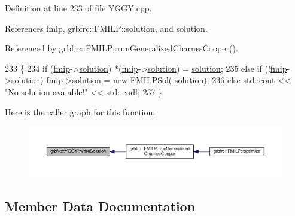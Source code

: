 Definition at line 233 of file Y\+G\+G\+Y.\+cpp.



References fmip, grbfrc\+::\+F\+M\+I\+L\+P\+::solution, and solution.



Referenced by grbfrc\+::\+F\+M\+I\+L\+P\+::run\+Generalized\+Charnes\+Cooper().


\begin{DoxyCode}
233                          \{
234     \textcolor{keywordflow}{if} (\hyperlink{classgrbfrc_1_1YGGY_aa4f63c22c95cd48cd87756ebc5de53aa}{fmip}->\hyperlink{classgrbfrc_1_1FMILP_ae7b20c4efb2d3a689d46a5b88329b207}{solution}) *(\hyperlink{classgrbfrc_1_1YGGY_aa4f63c22c95cd48cd87756ebc5de53aa}{fmip}->\hyperlink{classgrbfrc_1_1FMILP_ae7b20c4efb2d3a689d46a5b88329b207}{solution}) = \hyperlink{classgrbfrc_1_1YGGY_a26d38a8358290866b02c11a09ddd5b4e}{solution};
235     \textcolor{keywordflow}{else} \textcolor{keywordflow}{if} (!\hyperlink{classgrbfrc_1_1YGGY_aa4f63c22c95cd48cd87756ebc5de53aa}{fmip}->\hyperlink{classgrbfrc_1_1FMILP_ae7b20c4efb2d3a689d46a5b88329b207}{solution}) \hyperlink{classgrbfrc_1_1YGGY_aa4f63c22c95cd48cd87756ebc5de53aa}{fmip}->\hyperlink{classgrbfrc_1_1FMILP_ae7b20c4efb2d3a689d46a5b88329b207}{solution} = \textcolor{keyword}{new} FMILPSol(
      \hyperlink{classgrbfrc_1_1YGGY_a26d38a8358290866b02c11a09ddd5b4e}{solution});
236     \textcolor{keywordflow}{else} std::cout << \textcolor{stringliteral}{"No solution avaiable!"} << std::endl;
237 \}
\end{DoxyCode}


Here is the caller graph for this function\+:
\nopagebreak
\begin{figure}[H]
\begin{center}
\leavevmode
\includegraphics[width=350pt]{classgrbfrc_1_1YGGY_a3928f0ae2a03685c2f68408f5ac00e28_icgraph}
\end{center}
\end{figure}




\subsection{Member Data Documentation}
